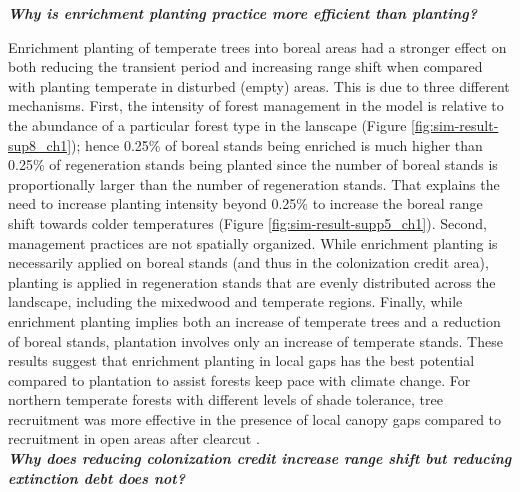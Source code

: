 \textbf{\emph{Why is enrichment planting practice more efficient than
planting?}}

Enrichment planting of temperate trees into boreal areas had a stronger
effect on both reducing the transient period and increasing range shift
when compared with planting temperate in disturbed (empty) areas. This
is due to three different mechanisms. First, the intensity of forest
management in the model is relative to the abundance of a particular
forest type in the lanscape (Figure \ref{fig:sim-result-sup8_ch1}); hence 0.25\% of boreal stands
being enriched is much higher than 0.25\% of regeneration stands being
planted since the number of boreal stands is proportionally larger than
the number of regeneration stands. That explains the need to increase
planting intensity beyond 0.25\% to increase the boreal range shift
towards colder temperatures (Figure \ref{fig:sim-result-supp5_ch1}). Second, management practices
are not spatially organized. While enrichment planting is necessarily
applied on boreal stands (and thus in the colonization credit area),
planting is applied in regeneration stands that are evenly distributed
across the landscape, including the mixedwood and temperate regions.
Finally, while enrichment planting implies both an increase of temperate
trees and a reduction of boreal stands, plantation involves only an
increase of temperate stands. These results suggest that enrichment
planting in local gaps has the best potential compared to plantation to
assist forests keep pace with climate change. For northern temperate
forests with different levels of shade tolerance, tree recruitment was
more effective in the presence of local canopy gaps compared to
recruitment in open areas after clearcut \citep{LePage2000}.\\

\textbf{\emph{Why does reducing colonization credit increase range shift
but reducing extinction debt does not?}}

